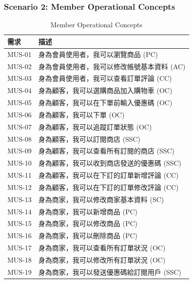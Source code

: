 \documentclass[a4paper, 12pt]{article}
\begin{document}
\subsubsection{Scenario 2: Member Operational Concepts}
\begin{table}[h]
    \centering
    \renewcommand{\arraystretch}{1.35}
    \begin{tabular}{|p{3cm}|p{10cm}|}
        \hline
        \textbf{需求} & \textbf{描述} \\
        \hline
        MUS-01 & 身為會員使用者，我可以瀏覽商品 (PC) \\
        \hline
        MUS-02 & 身為會員使用者，我可以修改帳號基本資料 (AC) \\
        \hline
        MUS-03 & 身為會員使用者，我可以查看訂單評論 (CC) \\
        \hline
        MUS-04 & 身為顧客，我可以選購商品加入購物車 (OC) \\
        \hline
        MUS-05 & 身為顧客，我可以在下單前輸入優惠碼 (OC) \\
        \hline
        MUS-06 & 身為顧客，我可以下單 (OC) \\
        \hline
        MUS-07 & 身為顧客，我可以追蹤訂單狀態 (OC) \\
        \hline
        MUS-08 & 身為顧客，我可以訂閱商店 (SSC) \\
        \hline
        MUS-09 & 身為顧客，我可以查看所有訂閱的商店 (SSC) \\
        \hline
        MUS-10 & 身為顧客，我可以收到商店發送的優惠碼 (SSC) \\
        \hline
        MUS-11 & 身為顧客，我可以在下訂的訂單新增評論 (CC) \\
        \hline
        MUS-12 & 身為顧客，我可以在下訂的訂單修改評論 (CC) \\
        \hline
        MUS-13 & 身為商家，我可以修改商家基本資料 (SC) \\
        \hline
        MUS-14 & 身為商家，我可以新增商品 (PC) \\
        \hline
        MUS-15 & 身為商家，我可以修改商品 (PC) \\
        \hline
        MUS-16 & 身為商家，我可以刪除商品 (PC) \\
        \hline
        MUS-17 & 身為商家，我可以查看所有訂單狀況 (OC) \\
        \hline
        MUS-18 & 身為商家，我可以修改所有訂單狀況 (OC) \\
        \hline
        MUS-19 & 身為商家，我可以發送優惠碼給訂閱用戶 (SSC) \\
        \hline
    \end{tabular}
    \caption{Member Operational Concepts}
    \label{tab:member-user-stories-requirements}
\end{table}
\newpage
\end{document}

